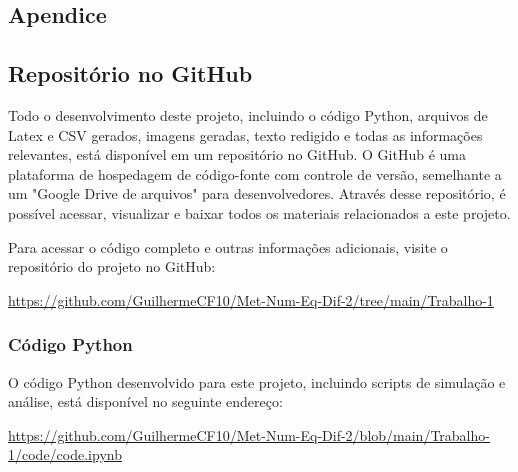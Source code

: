 \begin{titlepage}

    \section{Apendice}

    \subsection{Repositório no GitHub}

    Todo o desenvolvimento deste projeto, incluindo o código Python, arquivos de Latex e CSV gerados, imagens geradas, texto redigido e todas as informações relevantes, está disponível em um repositório no GitHub. O GitHub é uma plataforma de hospedagem de código-fonte com controle de versão, semelhante a um "Google Drive de arquivos" para desenvolvedores. Através desse repositório, é possível acessar, visualizar e baixar todos os materiais relacionados a este projeto.

    Para acessar o código completo e outras informações adicionais, visite o repositório do projeto no GitHub:
    \begin{center}
        \url{https://github.com/GuilhermeCF10/Met-Num-Eq-Dif-2/tree/main/Trabalho-1}
    \end{center}


    \subsubsection{Código Python}
    O código Python desenvolvido para este projeto, incluindo scripts de simulação e análise, está disponível no seguinte endereço:
    \begin{center}
        \url{https://github.com/GuilhermeCF10/Met-Num-Eq-Dif-2/blob/main/Trabalho-1/code/code.ipynb}
    \end{center}

\end{titlepage}